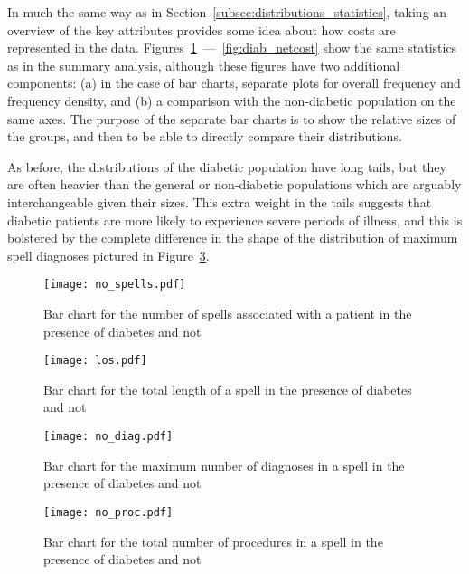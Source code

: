 In much the same way as in Section~\ref{subsec:distributions_statistics}, taking
an overview of the key attributes provides some idea about how costs are
represented in the data.
Figures~\ref{fig:diab_no_spells}~---~\ref{fig:diab_netcost} show the same
statistics as in the summary analysis, although these figures have two
additional components: (a) in the case of bar charts, separate plots for overall
frequency and frequency density, and (b) a comparison with the non-diabetic
population on the same axes. The purpose of the separate bar charts is to show
the relative sizes of the groups, and then to be able to directly compare their
distributions.

As before, the distributions of the diabetic population have long tails, but
they are often heavier than the general or non-diabetic populations which are
arguably interchangeable given their sizes. This extra weight in the tails
suggests that diabetic patients are more likely to experience severe periods of
illness, and this is bolstered by the complete difference in the shape of the
distribution of maximum spell diagnoses pictured in
Figure~\ref{fig:diab_no_diag}.

\begin{figure}
    \centering
    \texttt{[image: no\_spells.pdf]}
    \caption{%
        Bar chart for the number of spells associated with a patient in the
        presence of diabetes and not
    }\label{fig:diab_no_spells}
\end{figure}

\begin{figure}
    \centering
    \texttt{[image: los.pdf]}
    \caption{%
        Bar chart for the total length of a spell in the presence of diabetes
        and not
    }\label{fig:diab_los}
\end{figure}

\begin{figure}
    \centering
    \texttt{[image: no\_diag.pdf]}
    \caption{%
        Bar chart for the maximum number of diagnoses in a spell in the presence
        of diabetes and not
    }\label{fig:diab_no_diag}
\end{figure}

\begin{figure}
    \centering
    \texttt{[image: no\_proc.pdf]}
    \caption{%
        Bar chart for the total number of procedures in a spell in the presence
        of diabetes and not
    }\label{fig:diab_no_proc}
\end{figure}

